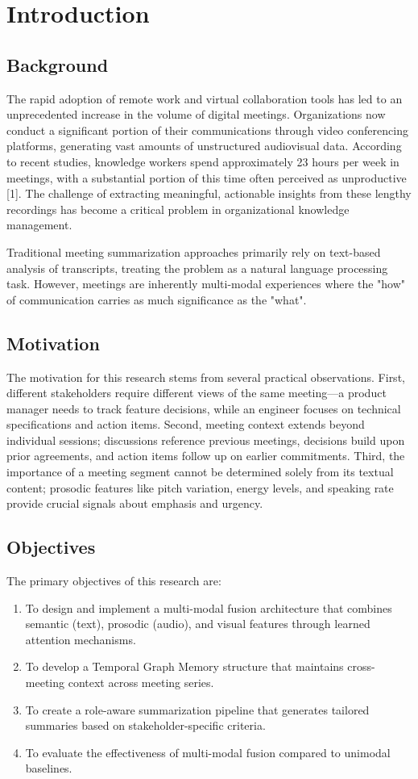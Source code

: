 \chapter{Introduction}
\noindent
\section{Background}
The rapid adoption of remote work and virtual collaboration tools has led to an unprecedented increase in the volume of digital meetings. Organizations now conduct a significant portion of their communications through video conferencing platforms, generating vast amounts of unstructured audiovisual data. According to recent studies, knowledge workers spend approximately 23 hours per week in meetings, with a substantial portion of this time often perceived as unproductive [1]. The challenge of extracting meaningful, actionable insights from these lengthy recordings has become a critical problem in organizational knowledge management.

Traditional meeting summarization approaches primarily rely on text-based analysis of transcripts, treating the problem as a natural language processing task. However, meetings are inherently multi-modal experiences where the "how" of communication carries as much significance as the "what".

\section{Motivation}
The motivation for this research stems from several practical observations. First, different stakeholders require different views of the same meeting—a product manager needs to track feature decisions, while an engineer focuses on technical specifications and action items. Second, meeting context extends beyond individual sessions; discussions reference previous meetings, decisions build upon prior agreements, and action items follow up on earlier commitments. Third, the importance of a meeting segment cannot be determined solely from its textual content; prosodic features like pitch variation, energy levels, and speaking rate provide crucial signals about emphasis and urgency.

\section{Objectives}
The primary objectives of this research are:
\begin{enumerate}
    \item To design and implement a multi-modal fusion architecture that combines semantic (text), prosodic (audio), and visual features through learned attention mechanisms.
    \item To develop a Temporal Graph Memory structure that maintains cross-meeting context across meeting series.
    \item To create a role-aware summarization pipeline that generates tailored summaries based on stakeholder-specific criteria.
    \item To evaluate the effectiveness of multi-modal fusion compared to unimodal baselines.
\end{enumerate}

